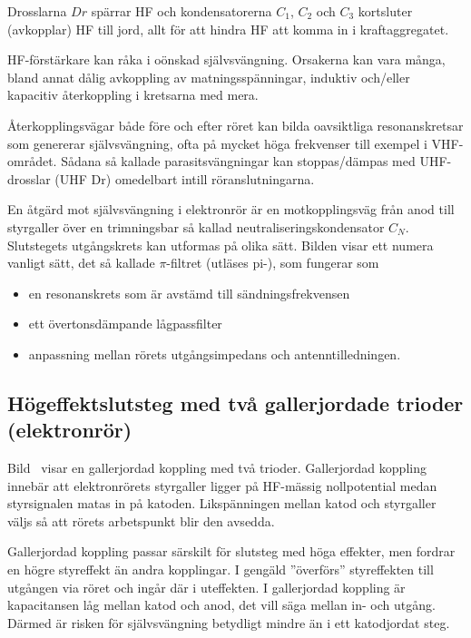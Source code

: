 Drosslarna \(Dr\) spärrar HF och kondensatorerna \(C_1\), \(C_2\) och
\(C_3\) kortsluter (avkopplar) HF till jord,
allt för att hindra HF att komma in i kraftaggregatet.

HF-förstärkare kan råka i oönskad självsvängning.
Orsakerna kan vara många, bland annat dålig avkoppling av matningsspänningar,
induktiv och/eller kapacitiv återkoppling i kretsarna med mera.

Återkopplingsvägar både före och efter röret kan bilda oavsiktliga
resonanskretsar som genererar självsvängning, ofta på mycket höga
frekvenser till exempel i VHF-området.
Sådana så kallade parasitsvängningar kan stoppas/dämpas med UHF-drosslar (UHF
Dr) omedelbart intill röranslutningarna.

En åtgärd mot självsvängning i elektronrör är en motkopplingsväg från anod till
styrgaller över en trimningsbar så kallad neutraliseringskondensator \(C_N\).
Slutstegets utgångskrets kan utformas på olika sätt.
Bilden visar ett numera vanligt sätt, det så kallade \(\pi\)-filtret (utläses
pi-), som fungerar som
\begin{itemize}
  \item en resonanskrets som är avstämd till sändningsfrekvensen
  \item ett övertonsdämpande lågpassfilter
  \item anpassning mellan rörets utgångsimpedans och antenntilledningen.
\end{itemize}

\subsection{Högeffektslutsteg med två gallerjordade trioder (elektronrör)}


Bild~ visar en gallerjordad koppling med två trioder.
Gallerjordad koppling innebär att elektronrörets styrgaller ligger på
HF-mässig nollpotential medan styrsignalen matas in på katoden.
Likspänningen mellan katod och styrgaller väljs så att rörets arbetspunkt blir
den avsedda.

Gallerjordad koppling passar särskilt för slutsteg med höga effekter,
men fordrar en högre styreffekt än andra kopplingar.
I gengäld ''överförs'' styreffekten till utgången via röret och ingår där i
uteffekten.
I gallerjordad koppling är kapacitansen låg mellan katod och anod, det vill
säga mellan in- och utgång.
Därmed är risken för självsvängning betydligt mindre än i ett katodjordat steg.

